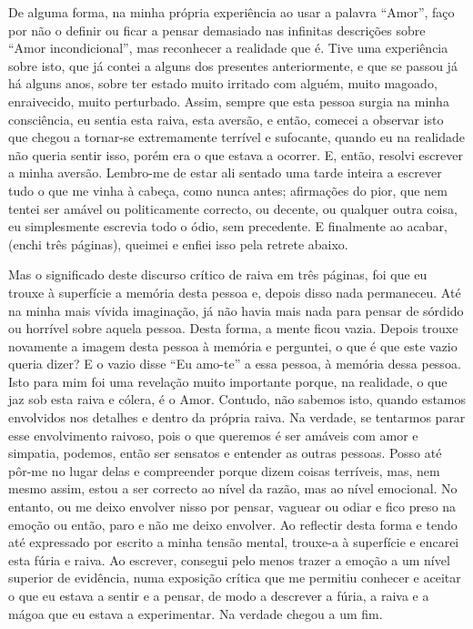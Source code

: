 De alguma forma, na minha própria experiência ao usar a palavra
``Amor'', faço por não o definir ou ficar a pensar demasiado nas
infinitas descrições sobre ``Amor incondicional'', mas reconhecer a
realidade que é. Tive uma experiência sobre isto, que já contei a alguns
dos presentes anteriormente, e que se passou já há alguns anos, sobre
ter estado muito irritado com alguém, muito magoado, enraivecido, muito
perturbado. Assim, sempre que esta pessoa surgia na minha consciência,
eu sentia esta raiva, esta aversão, e então, comecei a observar isto que
chegou a tornar-se extremamente terrível e sufocante, quando eu na
realidade não queria sentir isso, porém era o que estava a ocorrer. E,
então, resolvi escrever a minha aversão. Lembro-me de estar ali sentado
uma tarde inteira a escrever tudo o que me vinha à cabeça, como nunca
antes; afirmações do pior, que nem tentei ser amável ou politicamente
correcto, ou decente, ou qualquer outra coisa, eu simplesmente escrevia
todo o ódio, sem precedente. E finalmente ao acabar, (enchi três
páginas), queimei e enfiei isso pela retrete abaixo.

Mas o significado deste discurso crítico de raiva em três páginas, foi
que eu trouxe à superfície a memória desta pessoa e, depois disso nada
permaneceu. Até na minha mais vívida imaginação, já não havia mais nada
para pensar de sórdido ou horrível sobre aquela pessoa. Desta forma, a
mente ficou vazia. Depois trouxe novamente a imagem desta pessoa à
memória e perguntei, o que é que este vazio queria dizer? E o vazio
disse ``Eu amo-te'' a essa pessoa, à memória dessa pessoa. Isto para mim
foi uma revelação muito importante porque, na realidade, o que jaz sob
esta raiva e cólera, é o Amor. Contudo, não sabemos isto, quando estamos
envolvidos nos detalhes e dentro da própria raiva. Na verdade, se
tentarmos parar esse envolvimento raivoso, pois o que queremos é ser
amáveis com amor e simpatia, podemos, então ser sensatos e entender as
outras pessoas. Posso até pôr-me no lugar delas e compreender porque
dizem coisas terríveis, mas, nem mesmo assim, estou a ser correcto ao
nível da razão, mas ao nível emocional. No entanto, ou me deixo envolver
nisso por pensar, vaguear ou odiar e fico preso na emoção ou então, paro
e não me deixo envolver. Ao reflectir desta forma e tendo até expressado
por escrito a minha tensão mental, trouxe-a à superfície e encarei esta
fúria e raiva. Ao escrever, consegui pelo menos trazer a emoção a um
nível superior de evidência, numa exposição crítica que me permitiu
conhecer e aceitar o que eu estava a sentir e a pensar, de modo a
descrever a fúria, a raiva e a mágoa que eu estava a experimentar. Na
verdade chegou a um fim.


